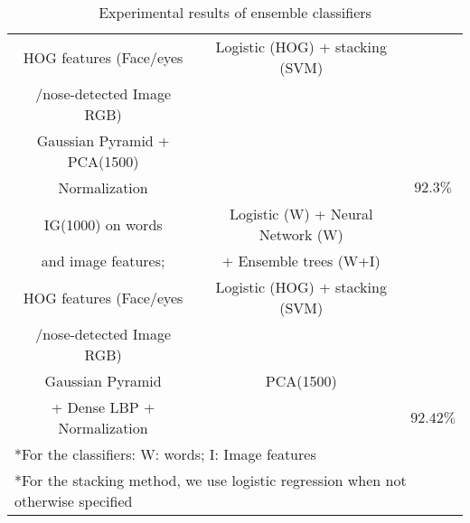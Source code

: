 \begin{table}[h!]
\begin{tabular}{ c c c}
HOG features (Face/eyes & Logistic (HOG) + stacking (SVM) &\\
/nose-detected Image RGB) & &  \\ 
Gaussian Pyramid + PCA(1500) & & \\
Normalization & & $92.3\%$  \\ \hline
IG(1000) on words & Logistic (W) + Neural Network (W) & \\ 
and image features; & + Ensemble trees (W+I) & \\
HOG features (Face/eyes & Logistic (HOG) + stacking (SVM) &\\
/nose-detected Image RGB) & &  \\ 
Gaussian Pyramid & PCA(1500) & \\
+ Dense LBP + Normalization & & $92.42\%$  \\ \hline
\multicolumn{3}{l}{*For the classifiers: W: words; I: Image features} \\
\multicolumn{3}{l}{*For the stacking method, we use logistic regression when not otherwise specified} \\
\hline
\end{tabular}
\caption{Experimental results of ensemble classifiers}
\label{Table 2}
\end{table}


